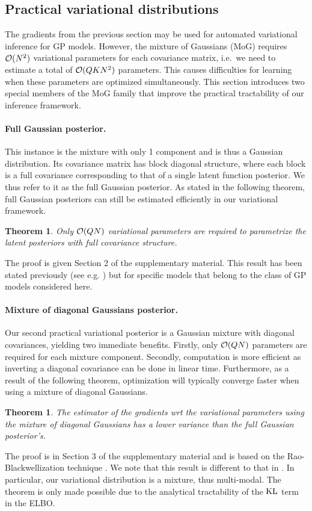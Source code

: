 \subsection{Practical variational distributions \label{sec:practicaldist}}
The gradients  from the previous section may be used for  automated variational inference for GP models.
However, the mixture of Gaussians (MoG) requires  $\mathcal{O}(N^2)$ variational parameters for each 
covariance matrix, i.e.~we need to  estimate a total of $\mathcal{O}(QKN^2)$ parameters.
This causes difficulties for learning when these  parameters are optimized simultaneously.
This section introduces two special members of the MoG family 
that  improve the practical tractability of our   inference framework.

\paragraph{Full Gaussian posterior.} This instance is the mixture with only 1 component and is thus a Gaussian distribution.
Its covariance matrix has block diagonal structure, where each block is a full covariance corresponding to that of a 
single latent function posterior.
We thus refer to it as the full Gaussian posterior. 
%
As stated in the following theorem,  full Gaussian posteriors can still be estimated efficiently in our variational framework.
\newtheorem{theorem2}[theorem1]{Theorem}
\begin{theorem2}
Only $\mathcal{O}(QN)$ variational parameters are required to parametrize the latent posteriors with full covariance structure.
\end{theorem2}
%
The proof is given Section 2 of  the supplementary material.
This result has  been stated previously (see e.g. \cite{nickisch2008approximations,nguyen2013efficient,opper-arch-nc-2009}) 
but for specific models that belong to the class of GP models considered here. 
%
\paragraph{Mixture of diagonal Gaussians posterior.} Our second practical variational posterior 
is a Gaussian mixture with diagonal covariances, yielding two immediate benefits.
Firstly, only $\mathcal{O}(QN)$ parameters are required for each mixture component.
Secondly, computation is more efficient as inverting a diagonal covariance can be done in linear time.
Furthermore, as a result of the following  theorem,
optimization will typically converge faster when using a mixture of diagonal Gaussians.
\newtheorem{theorem3}[theorem1]{Theorem}
\begin{theorem3}
The estimator of the gradients wrt the variational parameters using the mixture of 
diagonal Gaussians has a lower variance than the full Gaussian posterior's.
\end{theorem3}
%
The proof is in Section 3 of the supplementary material and is based on the Rao-Blackwellization technique \cite{casella1996rao}. 
We note that this result is different to that in \cite{ranganath2014black}.
In particular, our variational distribution is a mixture, thus multi-modal.
The theorem is only made possible due to the analytical tractability of the $\text{KL}$ term in the ELBO.

